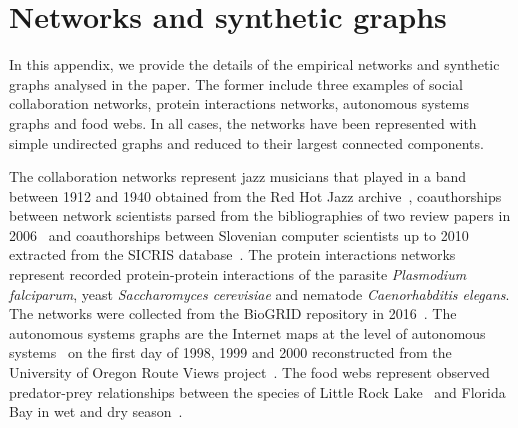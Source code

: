 \documentclass[]{rsif}
\newcommand{\celeg}{\emph{Caenorhabditis elegans}\xspace}
\newcommand{\scere}{\emph{Saccharomyces cerevisiae}\xspace}
\newcommand{\plasm}{\emph{Plasmodium falciparum}\xspace}
\newcommand{\littlerock}{Little Rock Lake\xspace}
\begin{document}




%
%

\appendix

\section{\label{app:nets}Networks and synthetic graphs}

In this appendix, we provide the details of the empirical networks and synthetic graphs analysed in the paper. The former include three examples of social collaboration networks, protein interactions networks, autonomous systems graphs and food webs. In all cases, the networks have been represented with simple undirected graphs and reduced to their largest connected components.

The collaboration networks represent jazz musicians that played in a band between 1912 and 1940 obtained from the Red Hot Jazz archive~\cite{GD03}, coauthorships between network scientists parsed from the bibliographies of two review papers in 2006~\cite{New06a} and coauthorships between Slovenian computer scientists up to 2010 extracted from the SICRIS database~\cite{BSB12}. The protein interactions networks represent recorded protein-protein interactions of the parasite \plasm, yeast \scere and nematode \celeg. The networks were collected from the BioGRID repository in 2016~\cite{SBRBBT06}. The autonomous systems graphs are the Internet maps at the level of autonomous systems~\cite{LKF07} on the first day of 1998, 1999 and 2000 reconstructed from the University of Oregon Route Views project~\cite{SNAP}. The food webs represent observed predator-prey relationships between the species of \littlerock~\cite{Mar91} and Florida Bay in wet and dry season~\cite{Pajek}.
\end{document}
